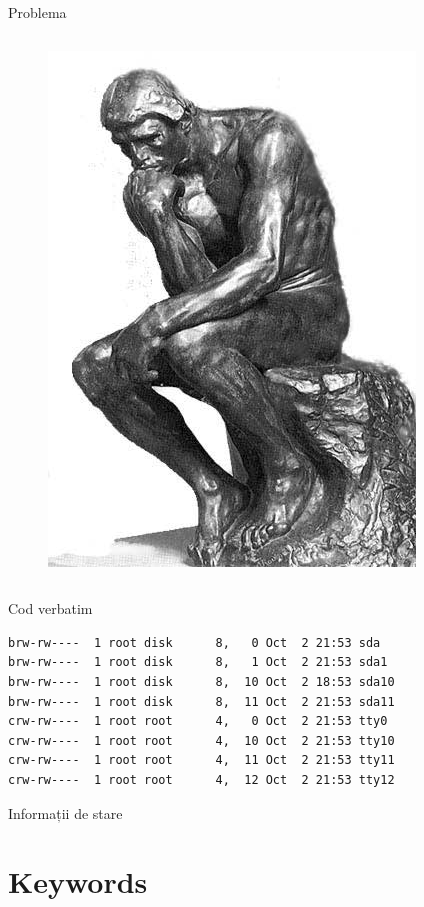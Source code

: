 \documentclass{training}
\begin{document}
\begin{frame}{Problema}
\begin{columns}
\begin{column}{0.45\textwidth}
\begin{figure}
         \includegraphics[scale=0.25]{img/thinker.jpg}
      \end{figure}
    \end{column}
  \end{columns}
\end{frame}

\begin{frame}[fragile]{Cod verbatim}
  \pause
  \footnotesize
  \begin{verbatim}
brw-rw----  1 root disk      8,   0 Oct  2 21:53 sda
brw-rw----  1 root disk      8,   1 Oct  2 21:53 sda1
brw-rw----  1 root disk      8,  10 Oct  2 18:53 sda10
brw-rw----  1 root disk      8,  11 Oct  2 21:53 sda11
crw-rw----  1 root root      4,   0 Oct  2 21:53 tty0
crw-rw----  1 root root      4,  10 Oct  2 21:53 tty10
crw-rw----  1 root root      4,  11 Oct  2 21:53 tty11
crw-rw----  1 root root      4,  12 Oct  2 21:53 tty12
  \end{verbatim}
\end{frame}

\begin{frame}{Informații de stare}
  
\end{frame}

\section{Keywords}
\end{document}
